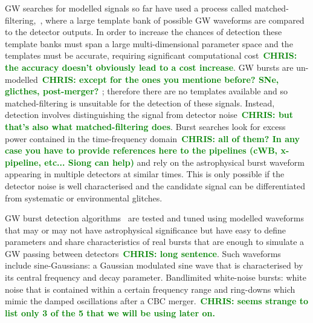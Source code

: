 \documentclass[12pt]{iopart}
\newcommand{\chris}[1]{\textbf{\textcolor{green}{CHRIS: #1}}}
\begin{document}
%
\ac{GW} searches for modelled signals so far have used a process called
matched-filtering,~\cite{Owen1998}, where a large template bank of possible
\ac{GW} waveforms are compared to the detector outputs. In order to increase
the chances of detection these template banks must span a large
multi-dimensional parameter space and the templates must be accurate, requiring
significant computational cost~\chris{the accuracy doesn't obviously lead to a
cost increase}. \ac{GW} bursts are un-modelled~\chris{except for the ones you
mentione before? SNe, glicthes, post-merger? }; therefore there are no
templates available and so matched-filtering is unsuitable for the detection of
these signals.  Instead, detection involves distinguishing the signal from
detector noise~\chris{but that's also what matched-filtering does}. Burst
searches look for excess power contained in the time-frequency
domain~\chris{all of them? In any case you have to provide references here to
the pipelines (cWB, x-pipeline, etc... Siong can help)} and rely on the
astrophysical burst waveform appearing in multiple detectors at similar times.
This is only possible if the detector noise is well characterised and the
candidate signal can be differentiated from systematic or environmental
glitches. 

%
\ac{GW} burst detection algorithms~\cite{Klimenko_2008, Aso_2008} are tested
and tuned using modelled waveforms that may or may not have astrophysical
significance but have easy to define parameters and share characteristics of
real bursts that are enough to simulate a \ac{GW} passing between
detectors~\chris{long sentence}. Such waveforms include sine-Gaussians: a
Gaussian modulated sine wave that is characterised by its central frequency and
decay parameter. Bandlimited white-noise bursts: white noise that is contained
within a certain frequency range and ring-downs which mimic the damped
oscillations after a \ac{CBC} merger.~\chris{seems strange to list only 3 of
the 5 that we will be using later on.}

%

\end{document}
